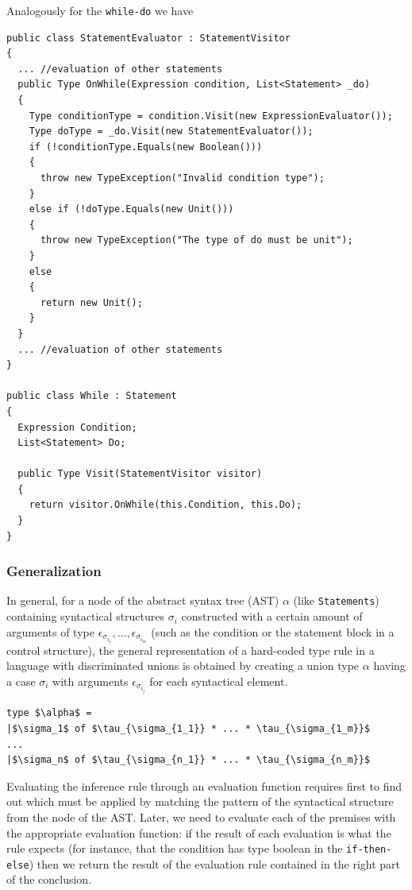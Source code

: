 Analogously for the \texttt{while-do} we have

\begin{lstlisting}
public class StatementEvaluator : StatementVisitor
{
  ... //evaluation of other statements
  public Type OnWhile(Expression condition, List<Statement> _do)
  {
    Type conditionType = condition.Visit(new ExpressionEvaluator());
    Type doType = _do.Visit(new StatementEvaluator());
    if (!conditionType.Equals(new Boolean()))
    {
      throw new TypeException("Invalid condition type");
    }
    else if (!doType.Equals(new Unit()))
    {
      throw new TypeException("The type of do must be unit");
    }
    else
    {
      return new Unit();
    }
  }
  ... //evaluation of other statements
}

public class While : Statement
{
  Expression Condition;
  List<Statement> Do;
  
  public Type Visit(StatementVisitor visitor)
  {
    return visitor.OnWhile(this.Condition, this.Do);
  }
}
\end{lstlisting}

\subsubsection{Generalization}
\label{sec:ch_metacasanova_inference_rule_generalization}

In general, for a node of the abstract syntax tree (AST) $\alpha$ (like \texttt{Statements}) containing syntactical structures $\sigma_{i}$ constructed with a certain amount of arguments of type $\epsilon_{\sigma_{i_1}}, ..., \epsilon_{\sigma_{i_m}}$ (such as the condition or the statement block in a control structure), the general representation of a hard-coded type rule in a language with discriminated unions is obtained by creating a union type $\alpha$ having a case $\sigma_{i}$ with arguments $\epsilon_{\sigma_{i_j}}$ for each syntactical element.

\begin{lstlisting}[mathescape = true]
type $\alpha$ =
|$\sigma_1$ of $\tau_{\sigma_{1_1}} * ... * \tau_{\sigma_{1_m}}$
...
|$\sigma_n$ of $\tau_{\sigma_{n_1}} * ... * \tau_{\sigma_{n_m}}$
\end{lstlisting}

Evaluating the inference rule through an evaluation function requires first to find out which must be applied by matching the pattern of the syntactical structure from the node of the AST. Later, we need to evaluate each of the premises with the appropriate evaluation function: if the result of each evaluation is what the rule expects (for instance, that the condition has type boolean in the \texttt{if-then-else}) then we return the result of the evaluation rule contained in the right part of the conclusion.

